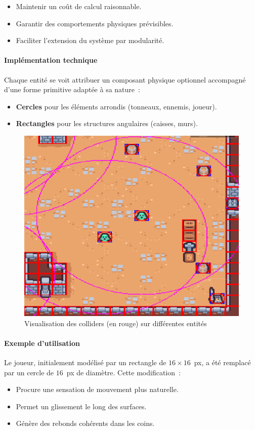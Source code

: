 \documentclass[a4paper,11pt]{article}
\begin{document}
\begin{itemize}
    \item Maintenir un coût de calcul raisonnable.
    \item Garantir des comportements physiques prévisibles.
    \item Faciliter l'extension du système par modularité.
\end{itemize}

\paragraph{Implémentation technique} 
Chaque entité se voit attribuer un composant physique optionnel accompagné d'une forme primitive adaptée à sa nature~:
\begin{itemize}
    \item \textbf{Cercles} pour les éléments arrondis (tonneaux, ennemis, joueur).
    \item \textbf{Rectangles} pour les structures angulaires (caisses, murs).
\end{itemize}
\begin{figure}[ht]
    \centering
    \includegraphics[width=0.75\linewidth]{./img/debugCollider.png}
    \caption{Visualisation des colliders (en rouge) sur différentes entités}
    \label{fig:colliders_exemple}
\end{figure}

\paragraph{Exemple d'utilisation} 
Le joueur, initialement modélisé par un rectangle de \(16 \times 16\)~px, a été remplacé par un cercle de \(16\)~px de diamètre. Cette modification~:
\begin{itemize}
    \item Procure une sensation de mouvement plus naturelle.
    \item Permet un glissement le long des surfaces.
    \item Génère des rebonds cohérents dans les coins.
\end{itemize}
\end{document}
